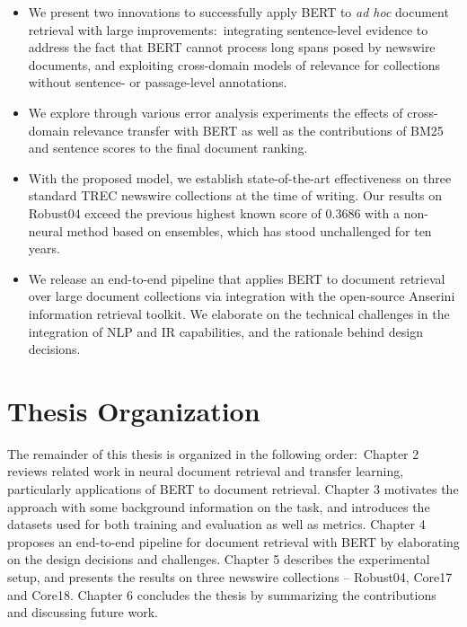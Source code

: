 \begin{itemize}
\item
We present two innovations to successfully apply BERT to \textit{ad hoc} document retrieval with large improvements:\
integrating sentence-level evidence to address the fact that BERT cannot process long spans posed by newswire documents, and exploiting cross-domain models of relevance for collections without sentence- or passage-level annotations.
\item
We explore through various error analysis experiments the effects of cross-domain relevance transfer with BERT as well as the contributions of BM25 and sentence scores to the final document ranking.
\item 
With the proposed model, we establish state-of-the-art effectiveness on three standard TREC newswire collections at the time of writing.
Our results on Robust04 exceed the previous highest known score of 0.3686 \cite{Cormack:2009:RRF:1571941.1572114} with a non-neural method based on ensembles, which has stood unchallenged for ten years.
\item
We release an end-to-end pipeline that applies BERT to document retrieval over large document collections via integration with the open-source Anserini information retrieval toolkit.
We elaborate on the technical challenges in the integration of NLP and IR capabilities, and the rationale behind design decisions.
\end{itemize}

\section{Thesis Organization}


The remainder of this thesis is organized in the following order:\
Chapter 2 reviews related work in neural document retrieval and transfer learning, particularly applications of BERT to document retrieval.
Chapter 3 motivates the approach with some background information on the task, and introduces the datasets used for both training and evaluation as well as metrics.
Chapter 4 proposes an end-to-end pipeline for document retrieval with BERT by elaborating on the design decisions and challenges.
Chapter 5 describes the experimental setup, and presents the results on three newswire collections -- Robust04, Core17 and Core18.
Chapter 6 concludes the thesis by summarizing the contributions and discussing future work.

